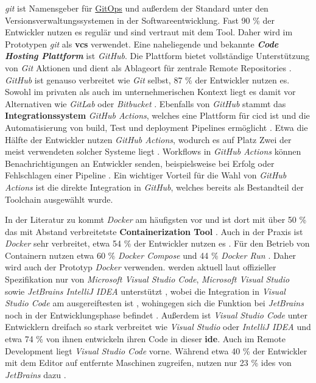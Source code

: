 \textit{\Gls{git}} ist Namensgeber für \hyperref[sec:03-03_gitops]{GitOps} und außerdem der Standard unter den Versionsverwaltungssystemen in der Softwareentwicklung. Fast 90 \% der Entwickler nutzen es regulär \cite{207:Developer-Ecosystem} und sind vertraut mit dem Tool. Daher wird im Prototypen \textit{\Gls{git}} als \textbf{\Gls{vcs}} verwendet. Eine naheliegende und bekannte \textbf{\textit{Code Hosting Plattform}} ist \textit{GitHub}. Die Plattform bietet vollständige Unterstützung von \textit{Git} Aktionen und dient als Ablageort für zentrale Remote Repositories \cite{301:About-GitHub-and-Git}. \textit{GitHub} ist genauso verbreitet wie \textit{Git} selbst, 87 \% der Entwickler nutzen es. Sowohl im privaten als auch im unternehmerischen Kontext liegt es damit vor Alternativen wie \textit{GitLab} oder \textit{Bitbucket} \cite{207:Developer-Ecosystem}. Ebenfalls von \textit{GitHub} stammt das \textbf{Integrationssystem} \textit{GitHub Actions}, welches eine Plattform für \Gls{cicd} ist und die Automatisierung von \Gls{build}, Test und \Gls{deployment} Pipelines ermöglicht \cite{302:Understanding-GitHub-Actions}. Etwa die Hälfte der Entwickler nutzen \textit{GitHub Actions}, wodurch es auf Platz Zwei der meist verwendeten solcher Systeme liegt \cite{207:Developer-Ecosystem}. Workflows in \textit{GitHub Actions} können Benachrichtigungen an Entwickler senden, beispielsweise bei Erfolg oder Fehlschlagen einer Pipeline \cite{307:Notifications-for-Workflow-Runs}. Ein wichtiger Vorteil für die Wahl von \textit{GitHub Actions} ist die direkte Integration in \textit{GitHub}, welches bereits als Bestandteil der Toolchain ausgewählt wurde.

In der Literatur zu  kommt \textit{Docker} am häufigsten vor und ist dort mit über 50 \% das mit Abstand verbreitetste \textbf{Containerization Tool} \cite{015:Containers-in-Software-Development}. Auch in der Praxis ist \textit{Docker} sehr verbreitet, etwa 54 \% der Entwickler nutzen es \cite{206:Developer-Survey-2024,207:Developer-Ecosystem}. Für den Betrieb von Containern nutzen etwa 60 \% \textit{Docker Compose} und 44 \% \textit{Docker Run} \cite{207:Developer-Ecosystem}. Daher wird auch der Prototyp \textit{Docker} verwenden.  werden aktuell laut offizieller Spezifikation nur von \textit{Microsoft Visual Studio Code}, \textit{Microsoft Visual Studio} sowie \textit{JetBrains IntelliJ IDEA} unterstützt \cite{306:Development-Containers}, wobei die Integration in \textit{Visual Studio Code} am ausgereiftesten ist \cite{204:Development-Containers-Simplified}, wohingegen sich die Funktion bei \textit{JetBrains} noch in der Entwicklungsphase befindet \cite{306:Development-Containers}. Außerdem ist \textit{Visual Studio Code} unter Entwicklern dreifach so stark verbreitet wie \textit{Visual Studio} oder \textit{IntelliJ IDEA} und etwa 74 \% von ihnen entwickeln ihren Code in dieser \textbf{\Gls{ide}}. Auch im Remote Development liegt \textit{Visual Studio Code} vorne. Während etwa 40 \% der Entwickler mit dem Editor auf entfernte Maschinen zugreifen, nutzen nur 23 \% \Glspl{ide} von \textit{JetBrains} dazu \cite{207:Developer-Ecosystem}.

